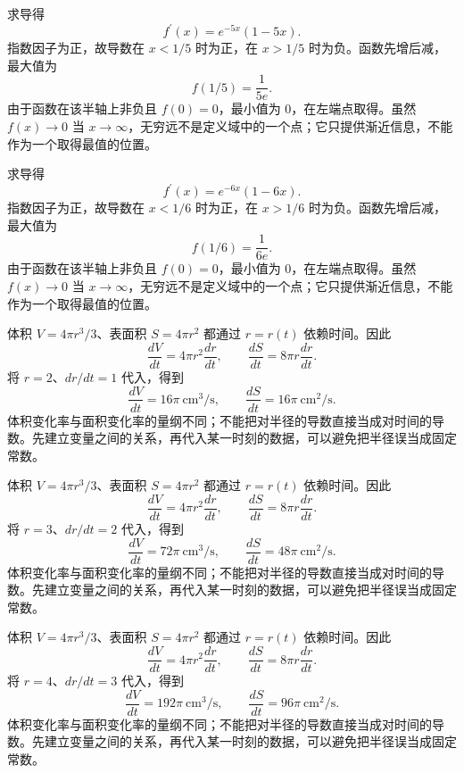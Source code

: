 \documentclass[UTF8,12pt,a4paper,fontset=fandol]{ctexart}
\begin{document}
\begin{solve}\label{ans:c11q18}
求导得
\[
f^{\prime}(x)=e^{-5x}(1-5x).
\]
指数因子为正，故导数在 $x<1/5$ 时为正，在 $x>1/5$ 时为负。函数先增后减，最大值为
\[
f(1/5)=\frac1{5e}.
\]
由于函数在该半轴上非负且 $f(0)=0$，最小值为 $0$，在左端点取得。虽然 $f(x)\to0$ 当 $x\to\infty$，无穷远不是定义域中的一个点；它只提供渐近信息，不能作为一个取得最值的位置。
\end{solve}

\begin{solve}\label{ans:c11q19}
求导得
\[
f^{\prime}(x)=e^{-6x}(1-6x).
\]
指数因子为正，故导数在 $x<1/6$ 时为正，在 $x>1/6$ 时为负。函数先增后减，最大值为
\[
f(1/6)=\frac1{6e}.
\]
由于函数在该半轴上非负且 $f(0)=0$，最小值为 $0$，在左端点取得。虽然 $f(x)\to0$ 当 $x\to\infty$，无穷远不是定义域中的一个点；它只提供渐近信息，不能作为一个取得最值的位置。
\end{solve}

\begin{solve}\label{ans:c11q20}
体积 $V=4\pi r^3/3$、表面积 $S=4\pi r^2$ 都通过 $r=r(t)$ 依赖时间。因此
\[
\frac{dV}{dt}=4\pi r^2\frac{dr}{dt},\qquad\frac{dS}{dt}=8\pi r\frac{dr}{dt}.
\]
将 $r=2$、$dr/dt=1$ 代入，得到
\[
\frac{dV}{dt}=16\pi\ \mathrm{cm}^3/\mathrm{s},\qquad\frac{dS}{dt}=16\pi\ \mathrm{cm}^2/\mathrm{s}.
\]
体积变化率与面积变化率的量纲不同；不能把对半径的导数直接当成对时间的导数。先建立变量之间的关系，再代入某一时刻的数据，可以避免把半径误当成固定常数。
\end{solve}

\begin{solve}\label{ans:c11q21}
体积 $V=4\pi r^3/3$、表面积 $S=4\pi r^2$ 都通过 $r=r(t)$ 依赖时间。因此
\[
\frac{dV}{dt}=4\pi r^2\frac{dr}{dt},\qquad\frac{dS}{dt}=8\pi r\frac{dr}{dt}.
\]
将 $r=3$、$dr/dt=2$ 代入，得到
\[
\frac{dV}{dt}=72\pi\ \mathrm{cm}^3/\mathrm{s},\qquad\frac{dS}{dt}=48\pi\ \mathrm{cm}^2/\mathrm{s}.
\]
体积变化率与面积变化率的量纲不同；不能把对半径的导数直接当成对时间的导数。先建立变量之间的关系，再代入某一时刻的数据，可以避免把半径误当成固定常数。
\end{solve}

\begin{solve}\label{ans:c11q22}
体积 $V=4\pi r^3/3$、表面积 $S=4\pi r^2$ 都通过 $r=r(t)$ 依赖时间。因此
\[
\frac{dV}{dt}=4\pi r^2\frac{dr}{dt},\qquad\frac{dS}{dt}=8\pi r\frac{dr}{dt}.
\]
将 $r=4$、$dr/dt=3$ 代入，得到
\[
\frac{dV}{dt}=192\pi\ \mathrm{cm}^3/\mathrm{s},\qquad\frac{dS}{dt}=96\pi\ \mathrm{cm}^2/\mathrm{s}.
\]
体积变化率与面积变化率的量纲不同；不能把对半径的导数直接当成对时间的导数。先建立变量之间的关系，再代入某一时刻的数据，可以避免把半径误当成固定常数。
\end{solve}
\end{document}
